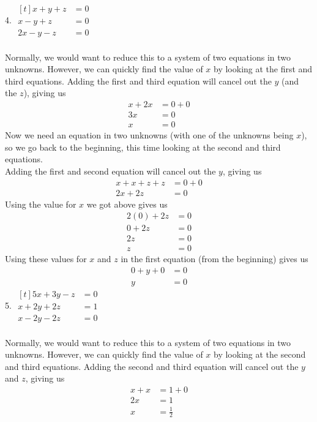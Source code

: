 \documentclass[12pt]{article}
\begin{document}
\setcounter{equation}{0}
4. $\begin{aligned}[t]
x+y+z&=0 \\
x-y+z&=0 \\
2x-y-z&=0
\end{aligned}$ \\
\\
Normally, we would want to reduce this to a system of two equations in two unknowns. However, we can quickly find the value of $x$ by looking at the first and third equations. Adding the first and third equation will cancel out the $y$ (and the $z$), giving us
\begin{align*}
x+2x&=0+0 \\
3x&=0 \\
x&=0
\end{align*}
Now we need an equation in two unknowns (with one of the unknowns being $x$), so we go back to the beginning, this time looking at the second and third equations. \\
Adding the first and second equation will cancel out the $y$, giving us
\begin{align*}
x+x+z+z&=0+0 \\
2x+2z&=0
\end{align*}
Using the value for $x$ we got above gives us
\begin{align*}
2(0)+2z&=0 \\
0+2z&=0 \\
2z&=0 \\
z&=0
\end{align*}
Using these values for $x$ and $z$ in the first equation (from the beginning) gives us
\begin{align*}
0+y+0&=0 \\
y&=0
\end{align*}
5. $\begin{aligned}[t]
5x+3y-z&=0 \\
x+2y+2z&=1 \\
x-2y-2z&=0
\end{aligned}$ \\
\\
Normally, we would want to reduce this to a system of two equations in two unknowns. However, we can quickly find the value of $x$ by looking at the second and third equations. Adding the second and third equation will cancel out the $y$ and $z$, giving us
\begin{align*}
x+x&=1+0 \\
2x&=1 \\
x&=\displaystyle \frac{1}{2}
\end{align*}
\end{document}
